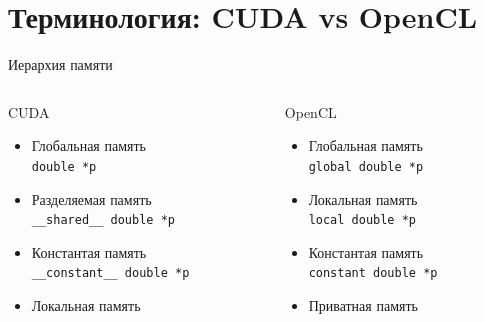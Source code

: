 \documentclass[@BEAMER_OPTIONS@]{beamer}
\newcommand{\code}[1]{\lstinline|#1|}
\begin{document}
\section{Терминология: CUDA vs OpenCL}
\begin{frame}
    \sectionpage
\end{frame}

\begin{frame}[fragile]{Иерархия памяти}
    \begin{columns}
        \begin{column}{0.48\textwidth}
            \begin{block}{CUDA}
                \begin{itemize}
                    \item<1-> Глобальная память\\
                        \code{double *p}
                    \item<2-> Разделяемая память\\
                        \code{__shared__ double *p}
                    \item<3-> Константая память\\
                        \code{__constant__ double *p}
                    \item<4-> Локальная память
                \end{itemize}
            \end{block}
        \end{column}
        \begin{column}{0.48\textwidth}
            \begin{block}{OpenCL}
                \begin{itemize}
                    \item<1-> Глобальная память\\
                        \code{global double *p}
                    \item<2-> Локальная память\\
                        \code{local double *p}
                    \item<3-> Константая память\\
                        \code{constant double *p}
                    \item<4-> Приватная память
                \end{itemize}
            \end{block}
        \end{column}
    \end{columns}
\end{frame}
\end{document}

